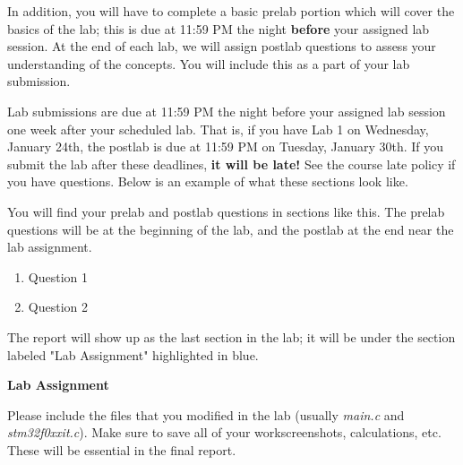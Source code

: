\documentclass[openany,11pt,fleqn]{book} %
\begin{document}
In addition, you will have to complete a basic prelab portion which will cover the basics of the lab; this is due at 11:59 PM the night \textbf{before} your assigned lab session. At the end of each lab, we will assign postlab questions to assess your understanding of the concepts. You will include this as a part of your lab submission.

Lab submissions are due at 11:59 PM the night before your assigned lab session one week after your scheduled lab. That is, if you have Lab 1 on Wednesday, January 24th, the postlab is due at 11:59 PM on Tuesday, January 30th. If you submit the lab after these deadlines, \textbf{it will be late!} See the course late policy if you have questions. Below is an example of what these sections look like.

\begin{question}[Questions]
	You will find your prelab and postlab questions in sections like this. The prelab questions will be at the beginning of the lab, and the postlab at the end near the lab assignment.
	\begin{enumerate} 
		\item Question 1
		\item Question 2
	\end{enumerate}
\end{question}

\noindent The report will show up as the last section in the lab; it will be under the section labeled "Lab Assignment" highlighted in blue.

{\addvspace{6pt}\sffamily\bfseries\centering\contentslabel[\thecontentslabel]{1.25cm}\color{blue}Lab Assignment}
\vspace{3mm}

\noindent Please include the files that you modified in the lab (usually \textit{main.c} and \textit{stm32f0xx\textunderscore it.c}). Make sure to save all of your work\textemdash screenshots, calculations, etc. These will be essential in the final report.
\end{document}
